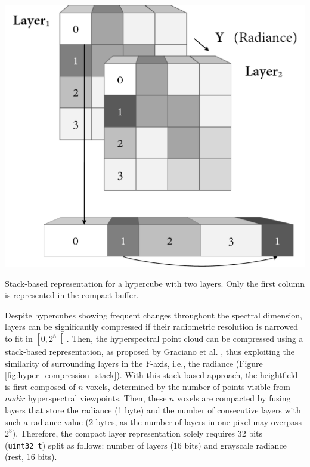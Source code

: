 \begin{marginfigure}[.cm]
    \centering
    \includegraphics[width=\linewidth]{figs/hyper_point_cloud/stack.png}
	\caption{Stack-based representation for a hypercube with two layers. Only the first column is represented in the compact buffer. }
	\label{fig:hyper_compression_stack}
\end{marginfigure}
Despite hypercubes showing frequent changes throughout the spectral dimension, layers can be significantly compressed if their radiometric resolution is narrowed to fit in $\left[0, 2^8\right[$. Then, the hyperspectral point cloud can be compressed using a stack-based representation, as proposed by Graciano et al. \cite{graciano_quadstack_2021}, thus exploiting the similarity of surrounding layers in the $Y$-axis, i.e., the radiance (Figure \ref{fig:hyper_compression_stack}). With this stack-based approach, the heightfield is first composed of $n$ voxels, determined by the number of points visible from $\textit{nadir}$ hyperspectral viewpoints. Then, these $n$ voxels are compacted by fusing layers that store the radiance (1 byte) and the number of consecutive layers with such a radiance value (2 bytes, as the number of layers in one pixel may overpass $2^8$). Therefore, the compact layer representation solely requires 32 bits (\verb|uint32_t|) split as follows: number of layers (16 bits) and grayscale radiance (rest, 16 bits).

